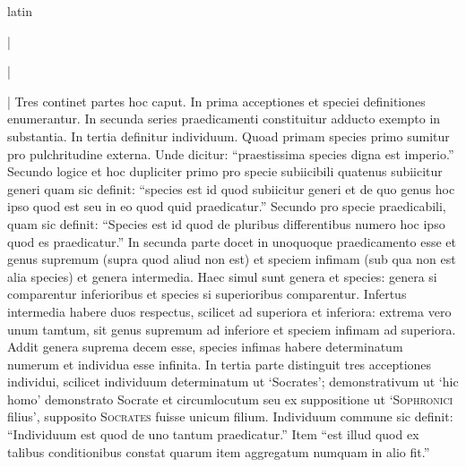 \begin{otherlanguage*}{latin}
        \pstart
        \pend
      
\pstart
 \textnormal{|}  
\pend

\pstart
 \textnormal{|}  
\pend

        \pstart
        \pend
      
\pstart
 \textnormal{|} Tres continet partes hoc caput. In prima acceptiones et speciei definitiones enumerantur. In secunda series praedicamenti constituitur adducto exempto in substantia. In tertia definitur individuum. Quoad primam species primo sumitur pro pulchritudine externa. Unde dicitur: \enquote{praestissima species digna est imperio.} Secundo logice et hoc dupliciter primo pro specie subiicibili quatenus subiicitur generi quam sic definit: \enquote{species est id quod subiicitur generi et de quo genus hoc ipso quod est seu in eo quod quid praedicatur.} Secundo pro specie praedicabili, quam sic definit: \enquote{Species est id quod de pluribus differentibus numero hoc ipso quod es praedicatur.} In secunda parte docet in unoquoque praedicamento esse et genus supremum (supra quod aliud non est) et speciem infimam (sub qua non est alia species) et genera intermedia. Haec simul sunt genera et species: genera si comparentur inferioribus et species si superioribus comparentur. Infertus intermedia habere duos respectus, scilicet ad superiora et inferiora: extrema vero unum tamtum, sit genus supremum ad inferiore et speciem infimam ad superiora. Addit genera suprema decem esse, species infimas habere determinatum numerum et individua esse infinita. In tertia parte distinguit tres acceptiones individui, scilicet individuum determinatum ut `Socrates'; demonstrativum ut `hic homo' demonstrato Socrate et circumlocutum seu ex suppositione ut `\textsc{Sophronici} filius', supposito \textsc{Socrates} fuisse unicum filium. Individuum commune sic definit: \enquote{Individuum est quod de uno tantum praedicatur.} Item \enquote{est illud quod ex talibus conditionibus constat quarum item aggregatum numquam in alio fit.} 
\pend


\end{otherlanguage*}
